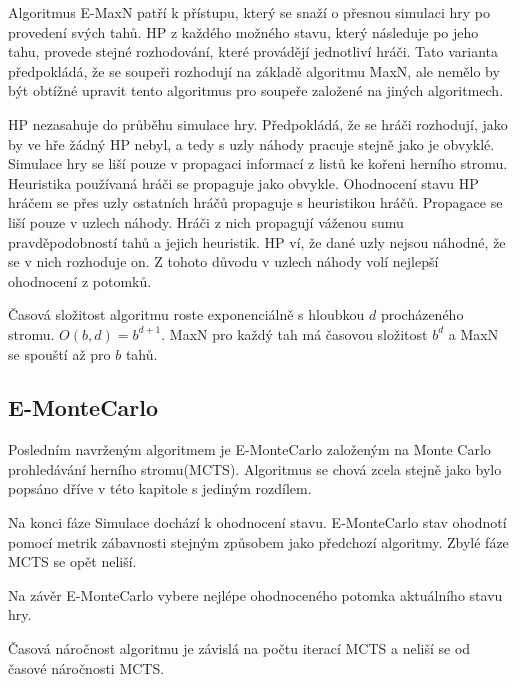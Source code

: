 Algoritmus E-MaxN patří k přístupu, který se snaží o přesnou simulaci hry po provedení svých tahů. HP z každého možného stavu, který následuje po jeho tahu, provede stejné rozhodování, které provádějí jednotliví hráči. Tato varianta předpokládá, že se soupeři rozhodují na základě algoritmu MaxN, ale nemělo by být obtížné upravit tento algoritmus pro soupeře založené na jiných algoritmech.

HP nezasahuje do průběhu simulace hry. Předpokládá, že se hráči rozhodují, jako by ve hře žádný HP nebyl, a tedy s uzly náhody pracuje stejně jako je obvyklé. Simulace hry se liší pouze v propagaci informací z listů ke kořeni herního stromu. Heuristika používaná hráči se propaguje jako obvykle. Ohodnocení stavu HP hráčem se přes uzly ostatních hráčů propaguje s heuristikou hráčů. Propagace se liší pouze v uzlech náhody. Hráči z nich propagují váženou sumu pravděpodobností tahů a jejich heuristik. HP ví, že dané uzly nejsou náhodné, že se v nich rozhoduje on. Z tohoto důvodu v uzlech náhody volí nejlepší ohodnocení z potomků.

Časová složitost algoritmu roste exponenciálně s hloubkou $d$ procházeného stromu. $O(b, d) = b^{d+1}$. MaxN pro každý tah má časovou složitost $b^d$ a MaxN se spouští až pro $b$ tahů.

\subsection{E-MonteCarlo}

Posledním navrženým algoritmem je E-MonteCarlo založeným na Monte Carlo prohledávání herního stromu(MCTS). Algoritmus se chová zcela stejně jako bylo popsáno dříve v této kapitole s jediným rozdílem.

Na konci fáze Simulace dochází k ohodnocení stavu. E-MonteCarlo stav ohodnotí pomocí metrik zábavnosti stejným způsobem jako předchozí algoritmy. Zbylé fáze MCTS se opět neliší.

Na závěr E-MonteCarlo vybere nejlépe ohodnoceného potomka aktuálního stavu hry.

Časová náročnost algoritmu je závislá na počtu iterací MCTS a neliší se od časové náročnosti MCTS.

\endinput
